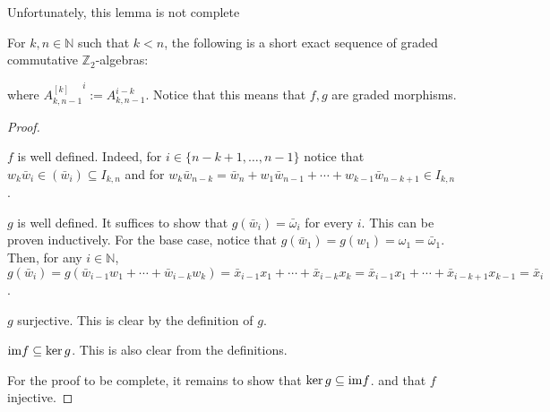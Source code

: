 Unfortunately, this lemma is not complete
\begin{lemma}\label{lem:SES} For $k,n\in\mathbb{N}$ such that $k<n$, the following is a short exact sequence of graded commutative $\mathbb{Z}_2$-algebras:
\begin{center}
\end{center}
where ${A_{k,n-1}^{[k]}}^i:=A_{k,n-1}^{i-k}$. Notice that this means that $f,g$ are graded morphisms.
\end{lemma}
\begin{proof}
\begin{b_item}
\item $f$ is well defined. Indeed, for $i\in\{n-k+1,\ldots,n-1\}$ notice that  $w_k\bar{w}_i\in(\bar{w}_i)\subseteq I_{k,n}$ and for $w_k\bar{w}_{n-k}=\bar{w}_n+w_1\bar{w}_{n-1}+\cdots+w_{k-1}\bar{w}_{n-k+1}\in I_{k,n}$.
\item $g$ is well defined. It suffices to show that $g(\bar{w}_i)=\bar{\omega}_i$ for every $i$. This can be proven inductively. For the base case, notice that $g(\bar{w}_1)=g(w_1)=\omega_1=\bar{\omega}_1$. Then, for any $i\in\mathbb{N}$, $g(\bar{w}_i)=g(\bar{w}_{i-1}w_1+\cdots+\bar{w}_{i-k}w_k)=\bar{x}_{i-1}x_1+\cdots+\bar{x}_{i-k}x_k=\bar{x}_{i-1}x_1+\cdots+\bar{x}_{i-k+1}x_{k-1}=\bar{x}_i$.
\item $g$ surjective. This is clear by the definition of $g$.
\item $\mathrm{im } f\subseteq\ker g$. This is also clear from the definitions.
\end{b_item}
For the proof to be complete, it remains to show that $\ker g\subseteq\mathrm{im } f$. and that $f$ injective.
\end{proof}

